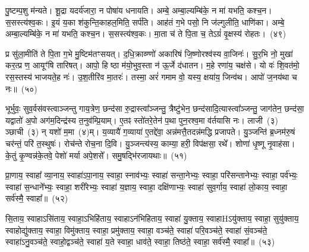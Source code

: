 पु॒ष्टम्प॒शु म॑न्यते। शू॒द्रा यदर्य॑जारा॒ न पोषा॑य धनायति। अम्बे॒ अम्बा॒ल्यम्बि॑के॒ न मा॑ यभति॒ कश्च॒न। स॒सस्त्य॑श्व॒कः। इ॒यं य॒का श॑कुन्ति॒काहल॒मिति॒ सर्प॑ति। आह॑तं ग॒भे पसो॒ नि ज॑ल्गुलीति॒ धाणि॑का। अम्बे॒ अम्बा॒ल्यम्बि॑के॒ न मा॑ यभति॒ कश्च॒न। स॒सस्त्य॑श्व॒कः। मा॒ता च॑ ते पि॒ता च॒ ते\-ऽग्रं॑ वृ॒क्षस्य॑ रोहतः।~(४९)

प्र सु॑ला॒मीति॑ ते पि॒ता ग॒भे मु॒ष्टिम॑तꣳसयत्। द॒धि॒क्राव्ण्णो॑ अकारिषं जि॒ष्णोरश्व॑स्य वा॒जिनः॑। सु॒र॒भि नो॒ मुखा॑ कर॒त्प्र ण॒ आयूꣳ॑षि तारिषत्। आपो॒ हि ष्ठा म॑यो॒भुव॒स्ता न॑ ऊ॒र्जे द॑धातन। म॒हे रणा॑य॒ चक्ष॑से। यो वः॑ शि॒वत॑मो॒ रस॒स्तस्य॑ भाजयते॒ह नः॑। उ॒श॒तीरि॑व मा॒तरः॑। तस्मा॒ अरं॑ गमाम वो॒ यस्य॒ क्षया॑य॒ जिन्व॑थ। आपो॑ ज॒नय॑था च नः॥~(५०)

{\anuvakamend[{आ॒सा॒मत्ति॒ न रो॑हतो॒ जिन्व॑थ च॒त्वारि॑ च}]}%

भूर्भुवः॒ सुव॒र्वस॑वस्त्वाञ्जन्तु गाय॒त्रेण॒ छन्द॑सा रु॒द्रास्त्वा᳚ञ्जन्तु॒ त्रैष्टु॑भेन॒ छन्द॑सादि॒त्यास्त्वा᳚ञ्जन्तु॒ जाग॑तेन॒ छन्द॑सा॒ यद्वातो॑ अ॒पो अग॑म॒दिन्द्र॑स्य त॒नुव॑म्प्रि॒याम्। ए॒तꣴ स्तो॑तरे॒तेन॑ प॒था पुन॒रश्व॒मा व॑र्तयासि नः। लाजी~(३) ञ्छाची~(३) न् यशो॑ म॒मा~(४)म्। य॒व्यायै॑ ग॒व्याया॑ ए॒तद्दे॑वा॒ अन्न॑मत्तै॒तदन्न॑मद्धि प्रजापते। यु॒ञ्जन्ति॑ ब्र॒ध्नम॑रु॒षं चर॑न्तं॒ परि॑ त॒स्थुषः॑। रोच॑न्ते रोच॒ना दि॒वि। यु॒ञ्जन्त्य॑स्य॒ काम्या॒ हरी॒ विप॑क्षसा॒ रथे᳚। शोणा॑ धृ॒ष्णू नृ॒वाह॑सा। के॒तुं कृ॒ण्वन्न॑के॒तवे॒ पेशो॑ मर्या अपे॒शसे᳚। समु॒षद्भि॑रजायथाः॥~(५१)

{\anuvakamend[{ब्र॒ध्नं पञ्च॑विꣳशतिश्च}]}%

प्रा॒णाय॒ स्वाहा᳚ व्या॒नाय॒ स्वाहा॑\-ऽपा॒नाय॒ स्वाहा॒ स्नाव॑भ्यः॒ स्वाहा॑ सन्ता॒नेभ्यः॒ स्वाहा॒ परि॑सन्तानेभ्यः॒ स्वाहा॒ पर्व॑भ्यः॒ स्वाहा॑ स॒न्धाने᳚भ्यः॒ स्वाहा॒ शरी॑रेभ्यः॒ स्वाहा॑ य॒ज्ञाय॒ स्वाहा॒ दक्षि॑णाभ्यः॒ स्वाहा॑ सुव॒र्गाय॒ स्वाहा॑ लो॒काय॒ स्वाहा॒ सर्व॑स्मै॒ स्वाहा᳚॥~(५२)

{\anuvakamend[{प्रा॒णाया॒ष्टाविꣳ॑शतिः}]}%

सि॒ताय॒ स्वाहा\-ऽसि॑ताय॒ स्वाहा॒\-ऽभिहि॑ताय॒ स्वाहा\-ऽन॑भिहिताय॒ स्वाहा॑ यु॒क्ताय॒ स्वाहाH\-ऽयु॑क्ताय॒ स्वाहा॒ सुयु॑क्ताय॒ स्वाहोद्यु॑क्ताय॒ स्वाहा॒ विमु॑क्ताय॒ स्वाहा॒ प्रमु॑क्ताय॒ स्वाहा॒ वञ्च॑ते॒ स्वाहा॑ परि॒वञ्च॑ते॒ स्वाहा॑ सं॒वञ्च॑ते॒ स्वाहा॑\-ऽनु॒वञ्च॑ते॒ स्वाहो॒द्वञ्च॑ते॒ स्वाहा॑ य॒ते स्वाहा॒ धाव॑ते॒ स्वाहा॒ तिष्ठ॑ते॒ स्वाहा॒ सर्व॑स्मै॒ स्वाहा᳚॥~(५३)

{\anuvakamend[{सि॒ताया॒ष्टात्रिꣳ॑शत्}]}%

